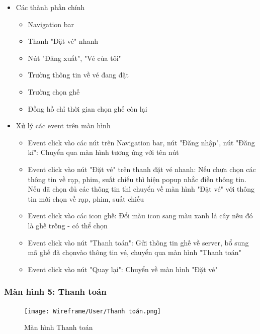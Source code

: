 \documentclass[a4paper, 12pt]{article}
\begin{document}
\begin{itemize}
	\item Các thành phần chính
	\begin{itemize}
		\item Navigation bar
		\item Thanh "Đặt vé" nhanh
		\item Nút "Đăng xuất", "Vé của tôi"
		\item Trường thông tin về vé đang đặt
		\item Trường chọn ghế
		\item Đồng hồ chỉ thời gian chọn ghế còn lại
	\end{itemize}

	\item Xử lý các event trên màn hình
	\begin{itemize}
		\item Event click vào các nút trên Navigation bar, nút "Đăng nhập", nút "Đăng kí": Chuyển qua màn hình tương ứng với tên nút
		\item Event click vào nút "Đặt vé" trên thanh đặt vé nhanh: Nếu chưa chọn các thông tin về rạp, phim, suất chiếu thì hiện popup nhắc điền thông tin. Nếu đã chọn đủ các thông tin thì chuyển về màn hình "Đặt vé" với thông tin mới chọn về rạp, phim, suất chiếu
		\item Event click vào các icon ghế: Đổi màu icon sang màu xanh lá cây nếu đó là ghế trống - có thể chọn
		\item Event click vào nút "Thanh toán": Gửi thông tin ghế về server, bổ sung mã ghế đã chọnvào thông tin vé, chuyển qua màn hình "Thanh toán"
		\item Event click vào nút "Quay lại": Chuyển về màn hình "Đặt vé"
	\end{itemize}
\end{itemize}

\subsubsection{Màn hình 5: Thanh toán}

\begin{figure}[H]
	\begin{center}
		\texttt{[image: Wireframe/User/Thanh toán.png]}
		\caption{Màn hình Thanh toán}
	\end{center}
\end{figure}
\end{document}

